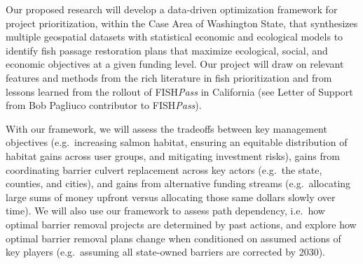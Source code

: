 Our proposed research will develop a data-driven optimization framework for project prioritization, within the Case Area of Washington State, that synthesizes multiple geospatial datasets with statistical economic and ecological models to identify fish passage restoration plans that maximize ecological, social, and economic objectives at a given funding level. Our project will draw on relevant features and methods from the rich literature in fish prioritization and from lessons learned from the rollout of FISH\emph{Pass} in California (see Letter of Support from Bob Pagliuco contributor to FISH\emph{Pass}).

With our framework, we will assess the tradeoffs between key management objectives (e.g.\ increasing salmon habitat, ensuring an equitable distribution of habitat gains across user groups, and mitigating investment risks), gains from coordinating barrier culvert replacement across key actors (e.g.\ the state, counties, and cities), and gains from alternative funding streams (e.g.\ allocating large sums of money upfront versus allocating those same dollars slowly over time). We will also use our framework to assess path dependency, i.e.\ how optimal barrier removal projects are determined by past actions, and explore how optimal barrier removal plans change when conditioned on assumed actions of key players (e.g.\ assuming all state-owned barriers are corrected by 2030).



